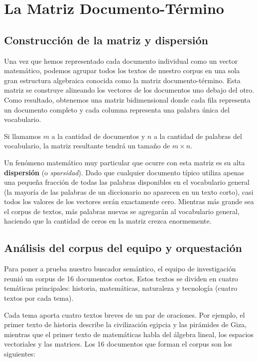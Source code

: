 \documentclass[12pt,a4paper]{article}
\begin{document}
\newpage
\section{La Matriz Documento-Término}

\subsection{Construcción de la matriz y dispersión}

Una vez que hemos representado cada documento individual como un vector matemático, podemos agrupar todos los textos de nuestro corpus en una sola gran estructura algebraica conocida como la matriz documento-término. Esta matriz se construye alineando los vectores de los documentos uno debajo del otro. Como resultado, obtenemos una matriz bidimensional donde cada fila representa un documento completo y cada columna representa una palabra única del vocabulario. 

Si llamamos $m$ a la cantidad de documentos y $n$ a la cantidad de palabras del vocabulario, la matriz resultante tendrá un tamaño de $m \times n$. 

Un fenómeno matemático muy particular que ocurre con esta matriz es su alta \textbf{dispersión} (o \textit{sparsidad}). Dado que cualquier documento típico utiliza apenas una pequeña fracción de todas las palabras disponibles en el vocabulario general (la mayoría de las palabras de un diccionario no aparecen en un texto corto), casi todos los valores de los vectores serán exactamente cero. Mientras más grande sea el corpus de textos, más palabras nuevas se agregarán al vocabulario general, haciendo que la cantidad de ceros en la matriz crezca enormemente.

\subsection{Análisis del corpus del equipo y orquestación}

Para poner a prueba nuestro buscador semántico, el equipo de investigación reunió un corpus de 16 documentos cortos. Estos textos se dividen en cuatro temáticas principales: historia, matemáticas, naturaleza y tecnología (cuatro textos por cada tema). 

Cada tema aporta cuatro textos breves de un par de oraciones. Por ejemplo, el primer texto de historia describe la civilización egipcia y las pirámides de Giza, mientras que el primer texto de matemáticas habla del álgebra lineal, los espacios vectoriales y las matrices. Los 16 documentos que forman el corpus son los siguientes:
\end{document}

